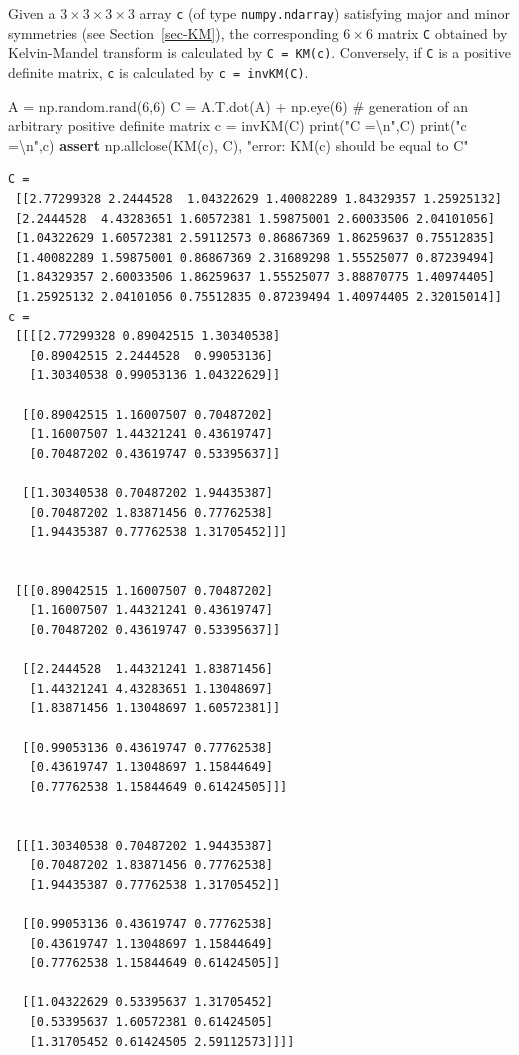 \documentclass[
  letterpaper,
  DIV=11,
  numbers=noendperiod]{scrreprt}
\newenvironment{Shaded}{\begin{snugshade}}{\end{snugshade}}
\newcommand{\BuiltInTok}[1]{\textcolor[rgb]{0.00,0.23,0.31}{#1}}
\newcommand{\CharTok}[1]{\textcolor[rgb]{0.13,0.47,0.30}{#1}}
\newcommand{\CommentTok}[1]{\textcolor[rgb]{0.37,0.37,0.37}{#1}}
\newcommand{\ControlFlowTok}[1]{\textcolor[rgb]{0.00,0.23,0.31}{\textbf{#1}}}
\newcommand{\DecValTok}[1]{\textcolor[rgb]{0.68,0.00,0.00}{#1}}
\newcommand{\NormalTok}[1]{\textcolor[rgb]{0.00,0.23,0.31}{#1}}
\newcommand{\OperatorTok}[1]{\textcolor[rgb]{0.37,0.37,0.37}{#1}}
\newcommand{\StringTok}[1]{\textcolor[rgb]{0.13,0.47,0.30}{#1}}
\begin{document}
Given a \(3×3×3×3\) array \texttt{c} (of type \texttt{numpy.ndarray})
satisfying major and minor symmetries (see Section~\ref{sec-KM}), the
corresponding \(6×6\) matrix \texttt{C} obtained by Kelvin-Mandel
transform is calculated by \texttt{C\ =\ KM(c)}. Conversely, if
\texttt{C} is a positive definite matrix, \texttt{c} is calculated by
\texttt{c\ =\ invKM(C)}.

\begin{Shaded}
\begin{Highlighting}[]
\NormalTok{A }\OperatorTok{=}\NormalTok{ np.random.rand(}\DecValTok{6}\NormalTok{,}\DecValTok{6}\NormalTok{)}
\NormalTok{C }\OperatorTok{=}\NormalTok{ A.T.dot(A) }\OperatorTok{+}\NormalTok{ np.eye(}\DecValTok{6}\NormalTok{) }\CommentTok{\# generation of an arbitrary positive definite matrix}
\NormalTok{c }\OperatorTok{=}\NormalTok{ invKM(C)}
\BuiltInTok{print}\NormalTok{(}\StringTok{"C =}\CharTok{\textbackslash{}n}\StringTok{"}\NormalTok{,C)}
\BuiltInTok{print}\NormalTok{(}\StringTok{"c =}\CharTok{\textbackslash{}n}\StringTok{"}\NormalTok{,c)}
\ControlFlowTok{assert}\NormalTok{ np.allclose(KM(c), C), }\StringTok{"error: KM(c) should be equal to C"}
\end{Highlighting}
\end{Shaded}

\begin{verbatim}
C =
 [[2.77299328 2.2444528  1.04322629 1.40082289 1.84329357 1.25925132]
 [2.2444528  4.43283651 1.60572381 1.59875001 2.60033506 2.04101056]
 [1.04322629 1.60572381 2.59112573 0.86867369 1.86259637 0.75512835]
 [1.40082289 1.59875001 0.86867369 2.31689298 1.55525077 0.87239494]
 [1.84329357 2.60033506 1.86259637 1.55525077 3.88870775 1.40974405]
 [1.25925132 2.04101056 0.75512835 0.87239494 1.40974405 2.32015014]]
c =
 [[[[2.77299328 0.89042515 1.30340538]
   [0.89042515 2.2444528  0.99053136]
   [1.30340538 0.99053136 1.04322629]]

  [[0.89042515 1.16007507 0.70487202]
   [1.16007507 1.44321241 0.43619747]
   [0.70487202 0.43619747 0.53395637]]

  [[1.30340538 0.70487202 1.94435387]
   [0.70487202 1.83871456 0.77762538]
   [1.94435387 0.77762538 1.31705452]]]


 [[[0.89042515 1.16007507 0.70487202]
   [1.16007507 1.44321241 0.43619747]
   [0.70487202 0.43619747 0.53395637]]

  [[2.2444528  1.44321241 1.83871456]
   [1.44321241 4.43283651 1.13048697]
   [1.83871456 1.13048697 1.60572381]]

  [[0.99053136 0.43619747 0.77762538]
   [0.43619747 1.13048697 1.15844649]
   [0.77762538 1.15844649 0.61424505]]]


 [[[1.30340538 0.70487202 1.94435387]
   [0.70487202 1.83871456 0.77762538]
   [1.94435387 0.77762538 1.31705452]]

  [[0.99053136 0.43619747 0.77762538]
   [0.43619747 1.13048697 1.15844649]
   [0.77762538 1.15844649 0.61424505]]

  [[1.04322629 0.53395637 1.31705452]
   [0.53395637 1.60572381 0.61424505]
   [1.31705452 0.61424505 2.59112573]]]]
\end{verbatim}
\end{document}

